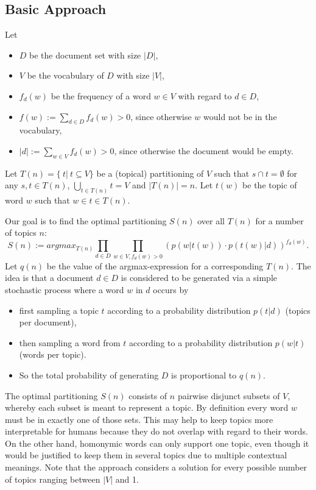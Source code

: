 \documentclass[10pt, a4paper, oneside]{article}
\begin{document}
\subsection{Basic Approach}
\label{basics}
Let
\begin{itemize}
\item $D$ be the document set with size $|D|$,
\item $V$ be the vocabulary of $D$ with size $|V|$,
\item $f_d(w)$ be the frequency of a word $w \in V$ with regard to $d \in D$,
\item $f(w) := \sum_{d \in D} f_d(w) > 0$, since otherwise $w$ would not be in the vocabulary,
\item $|d| := \sum_{w \in V} f_d(w) > 0$, since otherwise the document would be empty.
\end{itemize}
Let $T(n) = \{\ t |\ t \subseteq V\} $ be a (topical) partitioning of $V$ such that $s \cap t = \emptyset$ for any $s, t \in T(n)$, $\bigcup_{t \in T(n)} t = V$ and $|T(n)| = n$.
Let $t(w)$ be the topic of word $w$ such that $w \in t \in T(n)$.

Our goal is to find the optimal partitioning $S(n)$ over all $T(n)$ for a number of topics $n$:
\begin{equation}
\label{sn} 
S(n) := argmax_{T(n)} \prod_{d \in D} \prod_{w \in V, f_d(w) > 0} (p(w | t(w)) \cdot p(t(w) | d))^{f_d(w)}.
\end{equation}
Let $q(n)$ be the value of the argmax-expression for a corresponding $T(n)$.
The idea is that a document $d \in D$ is considered to be generated via a simple stochastic process where a word $w$ in $d$
occurs by
\begin{itemize}
\item first sampling a topic $t$ according to a probability distribution $p(t | d)$ (topics per document),
\item then sampling a word from $t$ according to a probability distribution $p(w | t)$ (words per topic).
\item So the total probability of generating $D$ is proportional to $q(n)$.
\end{itemize}
The optimal partitioning $S(n)$ consists of $n$ pairwise disjunct subsets of $V$, whereby each subset is meant to represent a topic.
By definition every word $w$ must be in exactly one of those sets. This may help to keep topics more interpretable for humans because they do not overlap with regard to their words. On the other hand, homonymic words can only support one topic, even though it would be justified to keep them in several topics due to multiple contextual meanings. Note that the approach considers a solution for every possible number of topics ranging between $|V|$ and 1.
\end{document}
